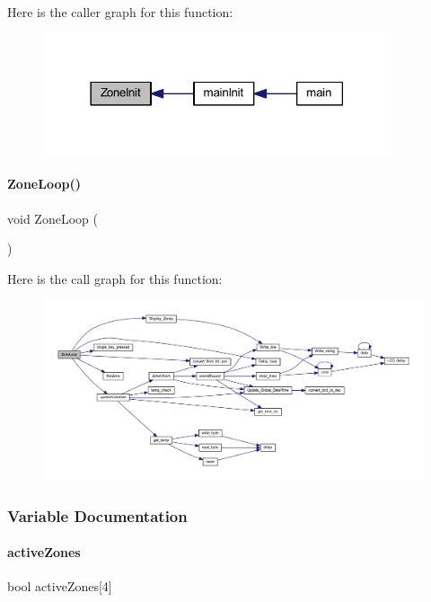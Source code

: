 Here is the caller graph for this function\+:
\nopagebreak
\begin{figure}[H]
\begin{center}
\leavevmode
\includegraphics[width=290pt]{a00062_aad1cb50e4ddc412138066d4c3b4d9529_icgraph}
\end{center}
\end{figure}
\mbox{\label{a00062_abccb53860a5e66a86e77b648e47cc4c4}} 
\paragraph{Zone\+Loop()}
{\footnotesize\ttfamily void Zone\+Loop (\begin{DoxyParamCaption}{ }\end{DoxyParamCaption})}

Here is the call graph for this function\+:
\nopagebreak
\begin{figure}[H]
\begin{center}
\leavevmode
\includegraphics[width=350pt]{a00062_abccb53860a5e66a86e77b648e47cc4c4_cgraph}
\end{center}
\end{figure}


\subsubsection{Variable Documentation}
\mbox{\label{a00062_a0c777c89cc8b06ddc6c0176f2c31033f}} 
\paragraph{active\+Zones}
{\footnotesize\ttfamily bool active\+Zones[4]}

